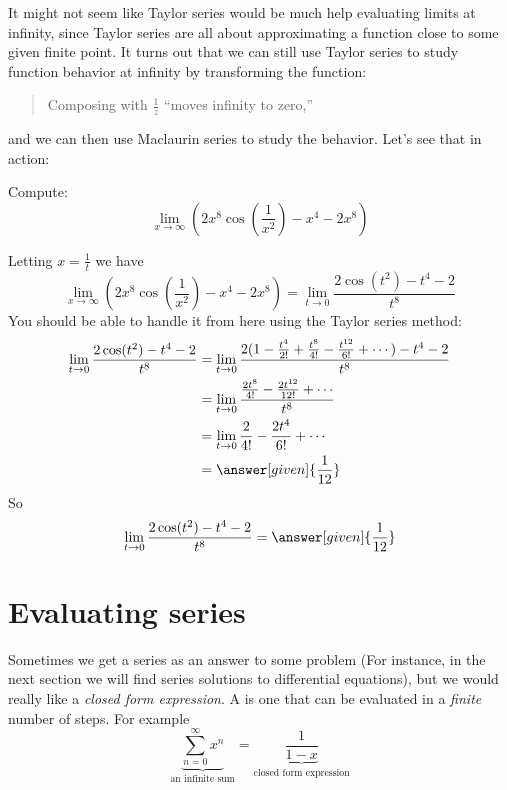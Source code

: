 \documentclass{ximera}
\begin{document}
It might not seem like Taylor series would be much help evaluating
limits at infinity, since Taylor series are all about approximating a
function close to some given finite point.  It turns out that we can
still use Taylor series to study function behavior at infinity by
transforming the function:
\begin{quote}
  Composing with $\frac{1}{z}$ ``moves infinity to zero,''
\end{quote}
and we can then use Maclaurin series to study the behavior.  Let's see
that in action:

\begin{example}
  Compute:	
  \[
  \lim_{x \to \infty} \left(2x^8\cos\left(\frac{1}{x^2}\right) - x^4-2x^8\right)
  \]
  \begin{explanation}
    Letting $x=\frac{1}{t}$ we have
	\[
	\lim_{x \to \infty} \left(2x^8\cos\left(\frac{1}{x^2}\right) - x^4-2x^8\right)=\lim_{t \to 0} \frac{2\cos\left(t^2\right) - t^4-2}{t^8}
	\]
	You should be able to handle it from here using the Taylor
        series method:
	\begin{align*}
	  \lim_{t \to 0} \frac{2\cos(t^2) - t^4-2}{t^8} &= \lim_{t \to 0} \frac{2(1-\frac{t^4}{2!}+\frac{t^8}{4!}-\frac{t^{12}}{6!}+\cdots) - t^4-2}{t^8}\\
	  &=  \lim_{t \to 0} \frac{\frac{2t^8}{4!}-\frac{2t^{12}}{12!}+\cdots}{t^8}\\
	  &=\lim_{t \to 0} \frac{2}{4!}-\frac{2t^4}{6!} +\cdots\\
	  &=\answer[given]{\frac{1}{12}}
        \end{align*}
        So
	\[
	\lim_{t \to 0} \frac{2\cos(t^2) - t^4-2}{t^8} = \answer[given]{\frac{1}{12}}
	\]
  \end{explanation}	
\end{example}

\section{Evaluating series}

Sometimes we get a series as an answer to some problem (For instance,
in the next section we will find series solutions to differential
equations), but we would really like a \textit{closed form expression}. A 
is one that can be evaluated in a \textit{finite} number of steps. For example
\[
\underbrace{\sum_{n=0}^\infty x^n}_\text{an infinite sum}  = \underbrace{\frac{1}{1-x}}_{\text{closed form expression}}
\]
\end{document}
